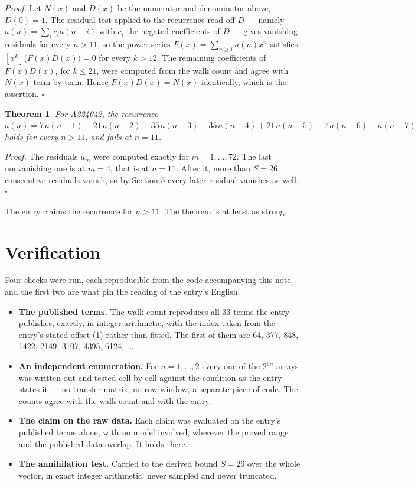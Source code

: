 \documentclass[11pt]{article}
\newtheorem{theorem}{Theorem}
\theoremstyle{definition}
\begin{document}
{\itshape Proof.} Let $N(x)$ and $D(x)$ be the numerator and denominator above, $D(0)=1$. The residual test applied to the recurrence read off $D$ --- namely $a(n) = \sum_i c_i a(n-i)$ with $c_i$ the negated coefficients of $D$ --- gives vanishing residuals for every $n > 11$, so the power series $F(x)=\sum_{n\ge 1}a(n)x^n$ satisfies $[x^k]\bigl(F(x)D(x)\bigr) = 0$ for every $k > 12$. The remaining coefficients of $F(x)D(x)$, for $k \le 21$, were computed from the walk count and agree with $N(x)$ term by term. Hence $F(x)D(x) = N(x)$ identically, which is the assertion. $\square$

\begin{theorem} For A224042, the recurrence $a(n) = 7\,a(n-1) - 21\,a(n-2) + 35\,a(n-3) - 35\,a(n-4) + 21\,a(n-5) - 7\,a(n-6) + a(n-7)$ holds for every $n > 11$, and fails at $n = 11$.\end{theorem}

{\itshape Proof.} The residuals $u_m$ were computed exactly for $m = 1,\dots,72$. The last nonvanishing one is at $m = 4$, that is at $n = 11$. After it, more than $S = 26$ consecutive residuals vanish, so by Section 5 every later residual vanishes as well. $\square$

The entry claims the recurrence for $n > 11$. The theorem is at least as strong.

\section{Verification}

Four checks were run, each reproducible from the code accompanying this note, and the first two are what pin the reading of the entry's English.

\begin{itemize}

\item {\bfseries The published terms.} The walk count reproduces all 33 terms the entry publishes, exactly, in integer arithmetic, with the index taken from the entry's stated offset (1) rather than fitted. The first of them are 64, 377, 848, 1422, 2149, 3107, 4395, 6124,~\dots

\item {\bfseries An independent enumeration.} For $n = 1,\dots,2$ every one of the $2^{6n}$ arrays was written out and tested cell by cell against the condition as the entry states it --- no transfer matrix, no row window, a separate piece of code. The counts agree with the walk count and with the entry.

\item {\bfseries The claim on the raw data.} Each claim was evaluated on the entry's published terms alone, with no model involved, wherever the proved range and the published data overlap. It holds there.

\item {\bfseries The annihilation test.} Carried to the derived bound $S = 26$ over the whole vector, in exact integer arithmetic, never sampled and never truncated.

\end{itemize}
\end{document}
